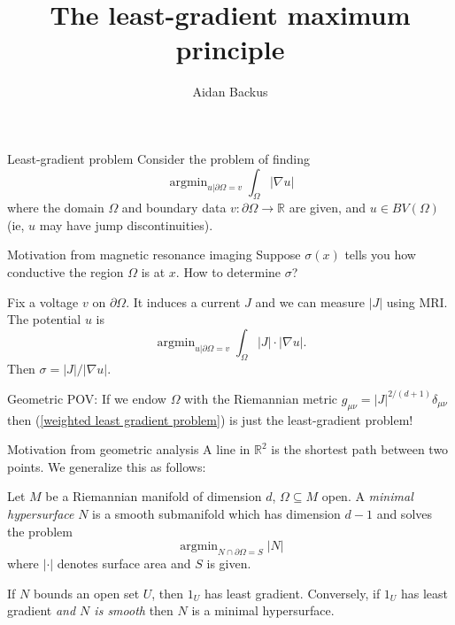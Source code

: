 \documentclass[10pt]{beamer}
\newcommand{\RR}{\mathbb{R}}
\DeclareMathOperator*{\argmin}{argmin}
\begin{document}
\title{The least-gradient maximum principle}
\author{Aidan Backus}
\begin{frame}
    \titlepage
\end{frame}

\begin{frame}{Least-gradient problem}
Consider the problem of finding
$$\argmin_{u|\partial \Omega = v} \int_\Omega |\nabla u|$$
where the domain $\Omega$ and boundary data $v: \partial \Omega \to \RR$ are given, and $u \in BV(\Omega)$ (ie, $u$ may have jump discontinuities).
\end{frame}

\begin{frame}{Motivation from magnetic resonance imaging}
    Suppose $\sigma(x)$ tells you how conductive the region $\Omega$ is at $x$. How to determine $\sigma$? \pause

    Fix a voltage $v$ on $\partial \Omega$. It induces a current $J$ and we can measure $|J|$ using MRI. The potential $u$ is
    \begin{equation}\label{weighted least gradient problem}
    \argmin_{u|\partial \Omega = v} \int_\Omega |J| \cdot |\nabla u|.
    \end{equation}
    Then $\sigma = |J|/|\nabla u|$. \pause

    Geometric POV: If we endow $\Omega$ with the Riemannian metric $g_{\mu\nu} = |J|^{2/(d + 1)}\delta_{\mu\nu}$ then (\ref{weighted least gradient problem}) is just the least-gradient problem!
\end{frame}

\begin{frame}{Motivation from geometric analysis}
    A line in $\RR^2$ is the shortest path between two points. We generalize this as follows:\pause

    \begin{definition}
    Let $M$ be a Riemannian manifold of dimension $d$, $\Omega \subseteq M$ open. A \emph{minimal hypersurface} $N$ is a smooth submanifold which has dimension $d - 1$ and solves the problem
    $$\argmin_{N \cap \partial \Omega = S} |N|$$
    where $|\cdot|$ denotes surface area and $S$ is given.
    \end{definition}\pause
    
    If $N$ bounds an open set $U$, then $1_U$ has least gradient. Conversely, if $1_U$ has least gradient \emph{and $N$ is smooth} then $N$ is a minimal hypersurface.
\end{frame}
\end{document}
